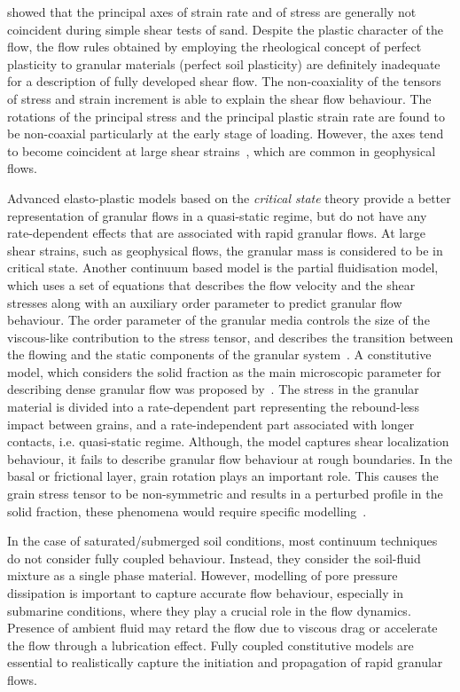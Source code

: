 \citet{Roscoe1970} showed that the principal axes of strain rate and of 
stress are generally not coincident during simple shear tests of sand. Despite 
the plastic character of the flow, the flow rules obtained by employing the 
rheological concept of perfect plasticity to granular materials (perfect soil 
plasticity) are definitely inadequate for a description of fully developed 
shear flow. The non-coaxiality of the tensors of stress and strain increment is 
able to explain the shear flow behaviour. The rotations of the principal stress 
and the principal plastic strain rate are found to be non-coaxial particularly 
at the early stage of loading. However, the axes tend 
to become coincident at large shear strains~\citep{Yu2006}, which are common in 
geophysical flows.

Advanced elasto-plastic models based on the \textit{critical state} theory
provide a better representation of granular flows in a quasi-static regime, but 
do not have any rate-dependent effects that are associated with rapid granular 
flows. At large shear strains, such as geophysical flows, the granular mass is 
considered to be in critical state. Another continuum based model is the 
partial fluidisation model, which uses a set of equations that describes the 
flow velocity and the shear stresses along with an auxiliary order parameter to 
predict granular flow behaviour. The order parameter of the granular media 
controls the size of the viscous-like contribution to the stress tensor, and 
describes the transition between the flowing and the static components of the 
granular system~\citep{Aranson2001}. A constitutive model, which considers the 
solid fraction as the main microscopic parameter for describing dense granular 
flow was proposed by~\citet{Josserand2004}. The stress in the granular material 
is divided into a rate-dependent part representing the rebound-less impact 
between grains, and a rate-independent part associated with longer contacts, 
i.e. quasi-static regime. Although, the model captures shear localization 
behaviour, it fails to describe granular flow behaviour at rough 
boundaries. In the basal or frictional layer, grain rotation plays an 
important role. This causes the grain stress tensor to be non-symmetric and 
results in a perturbed profile in the solid fraction, these phenomena would 
require specific modelling~\citep{Josserand2004}.

In the case of saturated/submerged soil conditions, most continuum 
techniques do not consider fully coupled behaviour. Instead, they consider 
the soil-fluid mixture as a single phase material. However, modelling of pore 
pressure dissipation is important to capture accurate flow behaviour, 
especially in submarine conditions, where they play a crucial role in the flow 
dynamics. Presence of ambient fluid may retard the flow due to viscous drag or 
accelerate the flow through a lubrication effect. Fully coupled constitutive 
models are essential to realistically capture the initiation and propagation of 
rapid granular flows.

